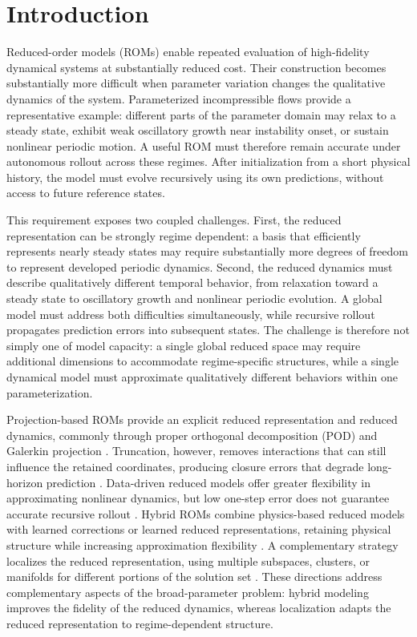 \section{Introduction}

Reduced-order models (ROMs) enable repeated evaluation of high-fidelity dynamical systems at substantially reduced cost. Their construction becomes substantially more difficult when parameter variation changes the qualitative dynamics of the system. Parameterized incompressible flows provide a representative example: different parts of the parameter domain may relax to a steady state, exhibit weak oscillatory growth near instability onset, or sustain nonlinear periodic motion. A useful ROM must therefore remain accurate under autonomous rollout across these regimes. After initialization from a short physical history, the model must evolve recursively using its own predictions, without access to future reference states.



This requirement exposes two coupled challenges. First, the reduced representation can be strongly regime dependent: a basis that efficiently represents nearly steady states may require substantially more degrees of freedom to represent developed periodic dynamics. Second, the reduced dynamics must describe qualitatively different temporal behavior, from relaxation toward a steady state to oscillatory growth and nonlinear periodic evolution. A global model must address both difficulties simultaneously, while recursive rollout propagates prediction errors into subsequent states. The challenge is therefore not simply one of model capacity: a single global reduced space may require additional dimensions to accommodate regime-specific structures, while a single dynamical model must approximate qualitatively different behaviors within one parameterization.


Projection-based ROMs provide an explicit reduced representation and reduced dynamics, commonly through proper orthogonal decomposition (POD) and
Galerkin projection \citep{sirovich1987,berkooz1993,benner2015}. Truncation, however, removes interactions that can still influence the retained coordinates, producing closure errors that degrade long-horizon prediction \citep{amsallem2012}. Data-driven reduced models offer greater flexibility in approximating nonlinear dynamics, but low one-step error does not guarantee accurate recursive rollout \citep{pathak2018,vlachas2018,duraisamy2019,brunton2020}. Hybrid ROMs combine physics-based reduced models with learned corrections or learned reduced representations, retaining physical structure while increasing approximation flexibility
\citep{dar2023,lee2020,fresca2022,geelen2023}. A complementary strategy localizes the reduced representation, using multiple subspaces, clusters, or manifolds for different portions of the solution set \citep{kaiser2014,li2021cluster,diaz2024}. These directions address complementary aspects of the broad-parameter problem: hybrid modeling improves the fidelity of the reduced dynamics, whereas localization adapts the reduced representation to regime-dependent structure.

